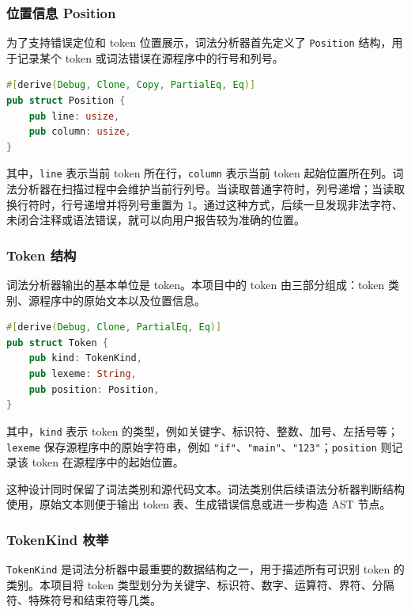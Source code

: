\documentclass[UTF8,a4paper,12pt]{ctexart}
\begin{document}
\subsubsection{位置信息 Position}

为了支持错误定位和 token 位置展示，词法分析器首先定义了 \texttt{Position} 结构，用于记录某个 token 或词法错误在源程序中的行号和列号。

\begin{lstlisting}[language=Rust,caption={Position 结构定义}]
#[derive(Debug, Clone, Copy, PartialEq, Eq)]
pub struct Position {
    pub line: usize,
    pub column: usize,
}
\end{lstlisting}

其中，\texttt{line} 表示当前 token 所在行，\texttt{column} 表示当前 token 起始位置所在列。词法分析器在扫描过程中会维护当前行列号。当读取普通字符时，列号递增；当读取换行符时，行号递增并将列号重置为 1。通过这种方式，后续一旦发现非法字符、未闭合注释或语法错误，就可以向用户报告较为准确的位置。

\subsubsection{Token 结构}

词法分析器输出的基本单位是 token。本项目中的 token 由三部分组成：token 类别、源程序中的原始文本以及位置信息。

\begin{lstlisting}[language=Rust,caption={Token 结构定义}]
#[derive(Debug, Clone, PartialEq, Eq)]
pub struct Token {
    pub kind: TokenKind,
    pub lexeme: String,
    pub position: Position,
}
\end{lstlisting}

其中，\texttt{kind} 表示 token 的类型，例如关键字、标识符、整数、加号、左括号等；\texttt{lexeme} 保存源程序中的原始字符串，例如 \texttt{"if"}、\texttt{"main"}、\texttt{"123"}；\texttt{position} 则记录该 token 在源程序中的起始位置。

这种设计同时保留了词法类别和源代码文本。词法类别供后续语法分析器判断结构使用，原始文本则便于输出 token 表、生成错误信息或进一步构造 AST 节点。

\subsubsection{TokenKind 枚举}

\texttt{TokenKind} 是词法分析器中最重要的数据结构之一，用于描述所有可识别 token 的类别。本项目将 token 类型划分为关键字、标识符、数字、运算符、界符、分隔符、特殊符号和结束符等几类。
\end{document}
